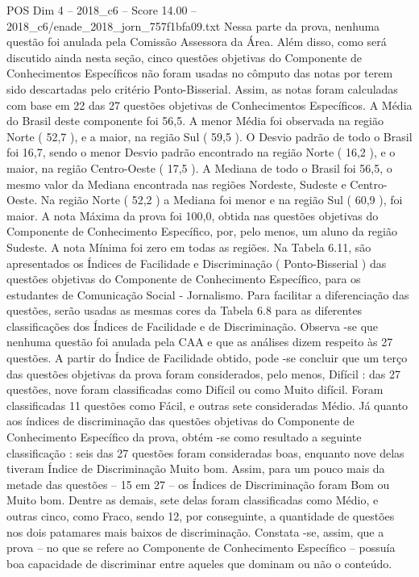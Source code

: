 \begin{textsample}{POS Dim 4 – 2018\_c6 – Score 14.00 – 2018\_c6/enade\_2018\_jorn\_757f1bfa09.txt}
Nessa parte da prova, nenhuma questão foi anulada pela Comissão Assessora da Área.
Além disso, como será discutido ainda nesta seção, cinco questões objetivas do Componente de Conhecimentos Específicos não foram usadas no cômputo das notas por terem sido descartadas pelo critério Ponto-Bisserial.
Assim, as notas foram calculadas com base em 22 das 27 questões objetivas de Conhecimentos Específicos.
A Média do Brasil deste componente foi 56,5.
A menor Média foi observada na região Norte ( 52,7 ), e a maior, na região Sul ( 59,5 ).
O Desvio padrão de todo o Brasil foi 16,7, sendo o menor Desvio padrão encontrado na região Norte ( 16,2 ), e o maior, na região Centro-Oeste ( 17,5 ).
A Mediana de todo o Brasil foi 56,5, o mesmo valor da Mediana encontrada nas regiões Nordeste, Sudeste e Centro-Oeste.
Na região Norte ( 52,2 ) a Mediana foi menor e na região Sul ( 60,9 ), foi maior.
A nota Máxima da prova foi 100,0, obtida nas questões objetivas do Componente de Conhecimento Específico, por, pelo menos, um aluno da região Sudeste.
A nota Mínima foi zero em todas as regiões.
Na Tabela 6.11, são apresentados os Índices de Facilidade e Discriminação ( Ponto-Bisserial ) das questões objetivas do Componente de Conhecimento Específico, para os estudantes de Comunicação Social - Jornalismo.
Para facilitar a diferenciação das questões, serão usadas as mesmas cores da Tabela 6.8 para as diferentes classificações dos Índices de Facilidade e de Discriminação.
Observa -se que nenhuma questão foi anulada pela CAA e que as análises dizem respeito às 27 questões.
A partir do Índice de Facilidade obtido, pode -se concluir que um terço das questões objetivas da prova foram considerados, pelo menos, Difícil : das 27 questões, nove foram classificadas como Difícil ou como Muito difícil.
Foram classificadas 11 questões como Fácil, e outras sete consideradas Médio.
Já quanto aos índices de discriminação das questões objetivas do Componente de Conhecimento Específico da prova, obtém -se como resultado a seguinte classificação : seis das 27 questões foram consideradas boas, enquanto nove delas tiveram Índice de Discriminação Muito bom.
Assim, para um pouco mais da metade das questões – 15 em 27 – os Índices de Discriminação foram Bom ou Muito bom.
Dentre as demais, sete delas foram classificadas como Médio, e outras cinco, como Fraco, sendo 12, por conseguinte, a quantidade de questões nos dois patamares mais baixos de discriminação.
Constata -se, assim, que a prova – no que se refere ao Componente de Conhecimento Específico – possuía boa capacidade de discriminar entre aqueles que dominam ou não o conteúdo.

\end{textsample}
